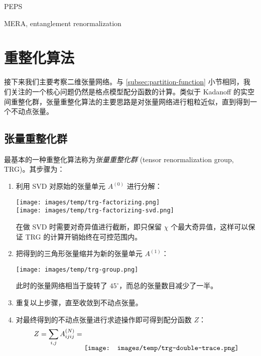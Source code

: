 PEPS

MERA, entanglement renormalization\cite{vidal2007entanglement,evenbly2009algorithms,konig2009exact,evenbly2014algorithms,evenbly2015tensor2}

\section{重整化算法}

接下来我们主要考察二维张量网络。与 \ref{subsec:partition-function} 小节相同，我们关注的一个核心问题仍然是格点模型配分函数的计算。类似于 Kadanoff 的实空间重整化群\cite{pathria2011statistical}，张量重整化算法的主要思路是对张量网络进行粗粒近似，直到得到一个不动点张量。

\subsection{张量重整化群}

最基本的一种重整化算法称为\emph{张量重整化群} (tensor renormalization group, TRG)\cite{levin2007tensor}。其步骤为：

\begin{enumerate}
  \item 利用 SVD 对原始的张量单元 $A^{(0)}$ 进行分解：
    \begin{center}
      \texttt{[image: images/temp/trg-factorizing.png]} \\
      \texttt{[image: images/temp/trg-factorizing-svd.png]}
    \end{center}
    在做 SVD 时需要对奇异值进行截断，即只保留 $\chi$ 个最大奇异值，这样可以保证 TRG 的计算开销始终在可控范围内。

  \item 把得到的三角形张量缩并为新的张量单元 $A^{(1)}$：
    \begin{center}
      \texttt{[image: images/temp/trg-group.png]}
    \end{center}
    此时的张量网络相当于旋转了 $45^\circ$，而总的张量数目减少了一半。

  \item 重复以上步骤，直至收敛到不动点张量。

  \item 对最终得到的不动点张量进行求迹操作即可得到配分函数 $Z$：
    \begin{equation}
      Z = \sum_{i,j} A^{(N)}_{ijij} = \raisebox{-2em}{\texttt{[image: images/temp/trg-double-trace.png]}}
    \end{equation}
\end{enumerate}

